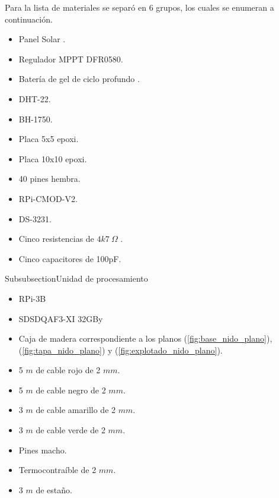 Para la lista de materiales se separó en 6 grupos, los cuales se enumeran a continuación.

\begin{itemize}
	\item Panel Solar \TBD.
	\item Regulador MPPT DFR0580.
	\item Batería de gel de ciclo profundo \TBD.
\end{itemize}

\begin{itemize}
	\item DHT-22.
	\item BH-1750.
	\item Placa 5x5 epoxi.
	\item Placa 10x10 epoxi.
	\item 40 pines hembra.
	\item RPi-CMOD-V2.
	\item DS-3231.
	\item Cinco resistencias de $4k7 \ \Omega$ .
	\item Cinco capacitores de 100pF.
\end{itemize}

Subsubsection{Unidad de procesamiento}
\begin{itemize}
	\item RPi-3B
	\item SDSDQAF3-XI 32GBy
\end{itemize}

\begin{itemize}
	\item Caja de madera correspondiente a los planos (\ref{fig:base_nido_plano}), (\ref{fig:tapa_nido_plano}) y (\ref{fig:explotado_nido_plano}).
\end{itemize}

\begin{itemize}
	\item 5 $m$ de cable rojo de 2 $mm$.
	\item 5 $m$ de cable negro de 2 $mm$.
	\item 3 $m$ de cable amarillo de 2 $mm$.
	\item 3 $m$ de cable verde de 2 $mm$.
	\item Pines macho.
	\item Termocontraíble de 2 $mm$.
	\item 3 $m$ de estaño.
\end{itemize}









